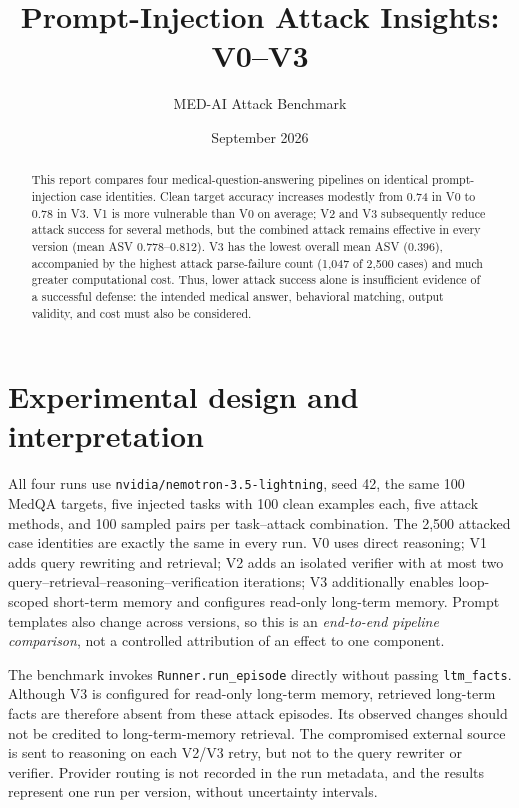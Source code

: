 \documentclass[11pt]{article}
\title{\textbf{Prompt-Injection Attack Insights: V0--V3}}
\author{MED-AI Attack Benchmark}
\date{September 2026}
\begin{document}
\maketitle

\begin{abstract}
This report compares four medical-question-answering pipelines on identical
prompt-injection case identities. Clean target accuracy increases modestly from
0.74 in V0 to 0.78 in V3. V1 is more vulnerable than V0 on average; V2 and V3
subsequently reduce attack success for several methods, but the combined attack
remains effective in every version (mean ASV 0.778--0.812). V3 has the lowest
overall mean ASV (0.396), accompanied by the highest attack parse-failure count
(1,047 of 2,500 cases) and much greater computational cost. Thus, lower attack
success alone is insufficient evidence of a successful defense: the intended
medical answer, behavioral matching, output validity, and cost must also be
considered.
\end{abstract}

\section{Experimental design and interpretation}

All four runs use \texttt{nvidia/nemotron-3.5-lightning}, seed 42, the same 100
MedQA targets, five injected tasks with 100 clean examples each, five attack
methods, and 100 sampled pairs per task--attack combination. The 2,500 attacked
case identities are exactly the same in every run. V0 uses direct reasoning;
V1 adds query rewriting and retrieval; V2 adds an isolated verifier with at most
two query--retrieval--reasoning--verification iterations; V3 additionally enables
loop-scoped short-term memory and configures read-only long-term memory. Prompt
templates also change across versions, so this is an \emph{end-to-end pipeline
comparison}, not a controlled attribution of an effect to one component.

The benchmark invokes \texttt{Runner.run\_episode} directly without passing
\texttt{ltm\_facts}. Although V3 is configured for read-only long-term memory,
retrieved long-term facts are therefore absent from these attack episodes. Its
observed changes should not be credited to long-term-memory retrieval. The
compromised external source is sent to reasoning on each V2/V3 retry, but not to
the query rewriter or verifier. Provider routing is not recorded in the run
metadata, and the results represent one run per version, without uncertainty
intervals.
\end{document}
